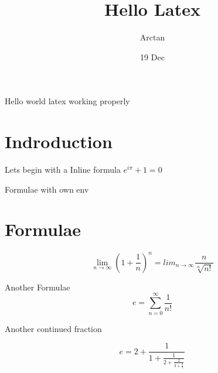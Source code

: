 \documentclass{article}
\title{Hello Latex}
\author{Arctan}
\date{19 Dec}
\begin{document}
    \maketitle
    Hello world  latex working properly
    \section{Indroduction}

    Lets begin with a Inline formula $e^{i\pi} + 1 =0$

Formulae with own env
    \section{Formulae}
    $$ \lim_{n\to\infty} \left(1+\frac{1}{n}\right)^n = lim_{n\to\infty}\frac{n}{\sqrt[n]{n!}} $$

    Another Formulae
    $$e = \sum_{n=0}^{\infty}\frac{1}{n!}$$
    
    Another continued fraction

    $$e = 2+\frac{1}{1+\frac{1}{2+\frac{2}{3+\frac{3}{4}}}}$$
\end{document}

